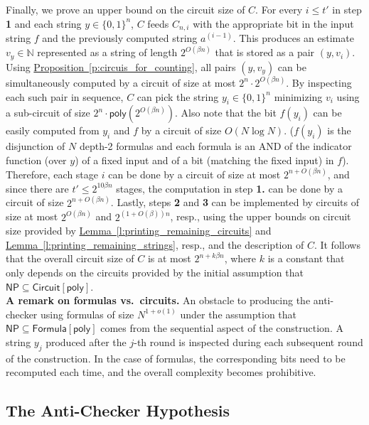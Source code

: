 \documentclass[11pt]{article}
\numberwithin{equation}{section}
\theoremstyle{definition}
\theoremstyle{plain}
\newcommand{\expref}[2]{\hyperref[#2]{#1~\ref{#2}}}
\begin{document}
Finally, we %
prove an upper bound on %
the circuit size of $C$. For every $i \leq t'$ in step \textbf{1} and each string $y \in \{0,1\}^n$, $C$ feeds $C_{n,i}$ with the appropriate bit in the input string $f$ and the previously computed string $a^{(i-1)}$. This produces an estimate $v_y \in \mathbb{N}$ represented as a string of length $2^{O(\beta n)}$ that is stored as a pair $(y,v_i)$. Using \expref{Proposition}{p:circuis_for_counting}, all pairs $(y,v_y)$ can be simultaneously computed by a circuit of size at most $2^n \cdot 2^{O(\beta n)}$. By inspecting each such pair in sequence, $C$ can pick the string $y_i \in \{0,1\}^n$ minimizing $v_i$ using a sub-circuit of size $2^{n} \cdot \mathsf{poly}(2^{O(\beta n)})$. Also note that the bit $f(y_i)$ can be easily computed from $y_i$ and $f$ by a circuit of size $O(N \log N)$. ($f(y_i)$ is the disjunction of $N$ depth-2 formulas and each formula is an AND of the indicator function (over $y$) of a fixed input and of a bit (matching the fixed input) in $f$). Therefore, each stage $i$ can be done by a circuit of size at most $2^{n + O(\beta n)}$, and since there are $t' \leq 2^{10\beta n}$ stages, the computation in step \textbf{1.}  can be done by a circuit of size $2^{n + O(\beta n)}$. Lastly, steps \textbf{2} and \textbf{3} can be implemented by
%
circuits  %
of size at most $2^{O(\beta n)}$ %
and %
$2^{(1+O(\beta))n}$,
resp.,   %
using the upper bounds on circuit size provided by 
\expref{Lemma}{l:printing_remaining_circuits}  %
and %
\expref{Lemma}{l:printing_remaining_strings},
resp.,   %
and the description of $C$. It follows that the overall circuit size of $C$ is at most $2^{n + k \beta n}$, where $k$ is a constant that only depends on the circuits provided by the initial assumption that $\mathsf{NP} \subseteq \mathsf{Circuit}[\mathsf{poly}]$.\\

\noindent \textbf{A remark on formulas vs.~circuits.} An obstacle to producing the anti-checker using formulas of size $N^{1 + o(1)}$ under the assumption that $\mathsf{NP} \subseteq \mathsf{Formula}[\mathsf{poly}]$ comes from the sequential aspect of the construction. A string $y_j$ produced after the $j$-th round is inspected during each subsequent round of the construction. In the case of formulas, the corresponding bits need to be recomputed each time, and the overall complexity becomes prohibitive. 



\subsection{The Anti-Checker Hypothesis}\label{ss:antichecker_hyp}
\end{document}
